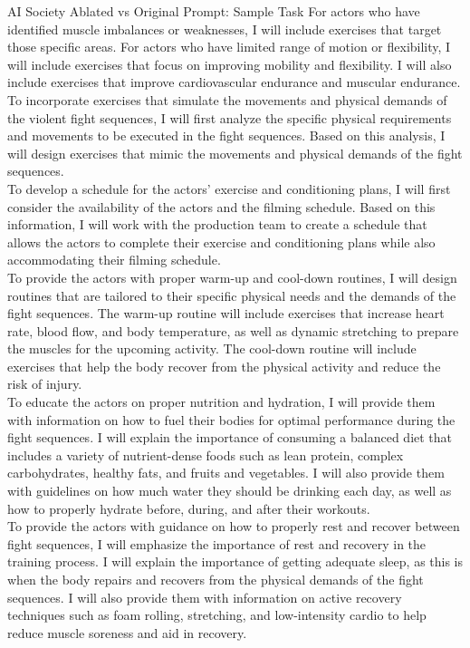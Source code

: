 \begin{AIBoxBreak}{AI Society Ablated vs Original Prompt: Sample Task}
	For actors who have identified muscle imbalances or weaknesses, I will include exercises that target those specific areas. For actors who have limited range of motion or flexibility, I will include exercises that focus on improving mobility and flexibility. I will also include exercises that improve cardiovascular endurance and muscular endurance.\\

	To incorporate exercises that simulate the movements and physical demands of the violent fight sequences, I will first analyze the specific physical requirements and movements to be executed in the fight sequences. Based on this analysis, I will design exercises that mimic the movements and physical demands of the fight sequences.\\

	To develop a schedule for the actors' exercise and conditioning plans, I will first consider the availability of the actors and the filming schedule. Based on this information, I will work with the production team to create a schedule that allows the actors to complete their exercise and conditioning plans while also accommodating their filming schedule.\\

	To provide the actors with proper warm-up and cool-down routines, I will design routines that are tailored to their specific physical needs and the demands of the fight sequences. The warm-up routine will include exercises that increase heart rate, blood flow, and body temperature, as well as dynamic stretching to prepare the muscles for the upcoming activity. The cool-down routine will include exercises that help the body recover from the physical activity and reduce the risk of injury.\\

	To educate the actors on proper nutrition and hydration, I will provide them with information on how to fuel their bodies for optimal performance during the fight sequences. I will explain the importance of consuming a balanced diet that includes a variety of nutrient-dense foods such as lean protein, complex carbohydrates, healthy fats, and fruits and vegetables. I will also provide them with guidelines on how much water they should be drinking each day, as well as how to properly hydrate before, during, and after their workouts.\\

	To provide the actors with guidance on how to properly rest and recover between fight sequences, I will emphasize the importance of rest and recovery in the training process. I will explain the importance of getting adequate sleep, as this is when the body repairs and recovers from the physical demands of the fight sequences. I will also provide them with information on active recovery techniques such as foam rolling, stretching, and low-intensity cardio to help reduce muscle soreness and aid in recovery.\\


\end{AIBoxBreak}
